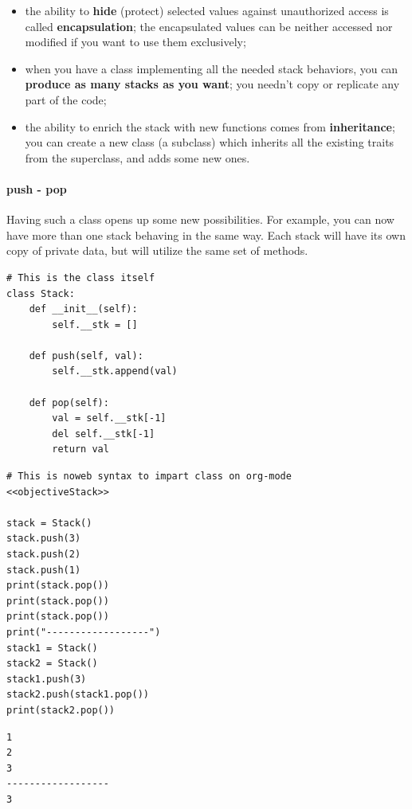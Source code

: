\documentclass[11pt]{article}
\begin{document}
\begin{itemize}
\item the ability to \textbf{hide} (protect) selected values against unauthorized
access is called \textbf{encapsulation}; the encapsulated values can be
neither accessed nor modified if you want to use them exclusively;
\item when you have a class implementing all the needed stack behaviors,
you can \textbf{produce as many stacks as you want}; you needn’t copy or
replicate any part of the code;
\item the ability to enrich the stack with new functions comes from
\textbf{inheritance}; you can create a new class (a subclass) which
inherits all the existing traits from the superclass, and adds some
new ones.
\end{itemize}

\paragraph{push - pop}
\label{sec:orge58228a}
Having such a class opens up some new possibilities. For example, you
can now have more than one stack behaving in the same way. Each stack
will have its own copy of private data, but will utilize the same set
of methods.

\begin{verbatim}
# This is the class itself 
class Stack:
	def __init__(self):
		self.__stk = []

	def push(self, val):
		self.__stk.append(val)

	def pop(self):
		val = self.__stk[-1]
		del self.__stk[-1]
		return val

\end{verbatim}


\begin{verbatim}
# This is noweb syntax to impart class on org-mode
<<objectiveStack>>

stack = Stack()
stack.push(3)
stack.push(2)
stack.push(1)
print(stack.pop())
print(stack.pop())
print(stack.pop())
print("------------------")
stack1 = Stack()
stack2 = Stack()
stack1.push(3)
stack2.push(stack1.pop())
print(stack2.pop())
\end{verbatim}

\begin{verbatim}
1
2
3
------------------
3
\end{verbatim}

\newpage
\end{document}
